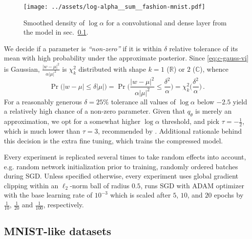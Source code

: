 \documentclass[a4paper,10pt]{article}
\newcommand{\real}{\mathbb{R}}
\newcommand{\cplx}{\mathbb{C}}
\begin{document}
\begin{figure}[ht]
  \centering
  \texttt{[image: ../assets/log-alpha\_\_sum\_\_fashion-mnist.pdf]}
  \caption{%
    Smoothed density of $\log\alpha$ for a convolutional and dense layer from the
    model in sec.~\ref{sub:mnist_like_datasets}.
  }
  \label{fig:log-alpha__mnist-like}
\end{figure}

We decide if a parameter is \textit{``non-zero''} if it is within $\delta$ relative
tolerance of its mean with high probability under the approximate posterior. Since
\eqref{eq:c-gauss-vi} is Gaussian, $
  \tfrac{\lvert w - \mu \rvert^2}
        {\alpha \lvert \mu \rvert^2}
$ is $\chi^2_k$ distributed with shape $k=1$ ($\real$) or $2$ ($\cplx$), whence
\begin{equation} \label{eq:prob_relevant}
  \Pr\bigl(
    \lvert w - \mu \rvert \leq \delta \lvert \mu \rvert
  \bigr)
    = \Pr\biggl(
      \frac{\lvert w - \mu \rvert^2}{\alpha \lvert \mu \rvert^2}
        \leq \frac{\delta^2}{\alpha}
    \biggr)
    = \chi^2_k\biggl(\frac{\delta^2}{\alpha}\biggr)
  \,.
\end{equation}
For a reasonably generous $\delta = 25\%$ tolerance all values of $\log \alpha$ below
$-2.5$ yield a relatively high chance of a non-zero parameter. Given that $q_\theta$
is merely an approximation, we opt for a somewhat higher $\log \alpha$ threshold, and
pick $\tau = -\tfrac12$, which is much lower than $\tau = 3$, recommended by
\citet{molchanov_variational_2017}. Additional rationale behind this decision is the
extra fine tuning, which trains the compressed model.

Every experiment is replicated several times to take random effects into account, e.g.
random network initialization prior to training, randomly ordered batches during SGD.
Unless specified otherwise, every experiment uses global gradient clipping within an
$\ell_2$-norm ball of radius $0.5$, runs SGD with ADAM optimizer with the base learning
rate of $10^{-3}$ which is scaled after $5$, $10$, and $20$ epochs by $\tfrac1{10}$,
$\tfrac1{20}$ and $\tfrac1{100}$, respectively.



\subsection{MNIST-like datasets} %
\label{sub:mnist_like_datasets}
\end{document}
